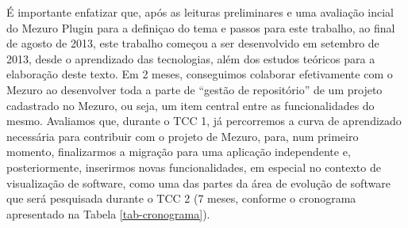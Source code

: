 É importante enfatizar que, após as leituras preliminares e uma avaliação incial do Mezuro Plugin para a definiçao do tema e passos para este trabalho, ao final de agosto de 2013, este trabalho começou a ser desenvolvido em setembro de 2013, desde o aprendizado das tecnologias, além dos estudos teóricos para a elaboração deste texto.
%
Em 2 meses, conseguimos colaborar efetivamente com o Mezuro ao desenvolver toda a parte de ``gestão de repositório'' de um projeto cadastrado no Mezuro, ou seja, um item central entre as funcionalidades do mesmo.
%
Avaliamos que, durante o TCC 1, já percorremos a curva de aprendizado necessária para contribuir com o projeto de Mezuro, para, num primeiro momento, finalizarmos a migração para uma aplicação independente e, posteriormente, inserirmos novas funcionalidades, em especial no contexto de visualização de software, como uma das partes da área de evolução de software que será pesquisada durante o TCC 2 (7 meses, conforme o cronograma apresentado na Tabela \ref{tab-cronograma}).
 

